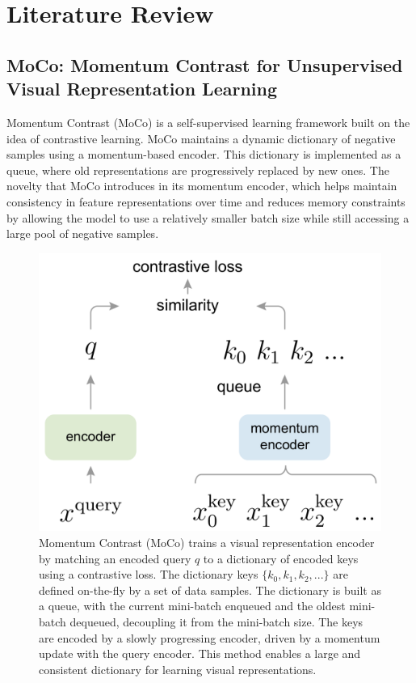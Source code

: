 \section{Literature Review}
\label{sec:related_work}

\subsection{MoCo: Momentum Contrast for Unsupervised Visual Representation Learning}

Momentum Contrast (MoCo) \cite{he2020momentum} is a self-supervised learning framework built on the idea of contrastive learning. MoCo maintains a dynamic dictionary of negative samples using a momentum-based encoder. This dictionary is implemented as a queue, where old representations are progressively replaced by new ones. The novelty that MoCo introduces in its momentum encoder, which helps maintain consistency in feature representations over time and reduces memory constraints by allowing the model to use a relatively smaller batch size while still accessing a large pool of negative samples.

\begin{figure}[t]\centering
\vspace{1.em}
\includegraphics[width=.65\linewidth]{images/MoCo_Architecture.png}
\caption{Momentum Contrast (MoCo) trains a visual representation encoder by matching an encoded query $q$ to a dictionary of encoded keys using a contrastive loss. The dictionary keys $\{k_0, k_1, k_2, ...\}$ are defined on-the-fly by a set of data samples.
The dictionary is built as a queue, with the current mini-batch enqueued and the oldest mini-batch dequeued, decoupling it from the mini-batch size.
The keys are encoded by a slowly progressing encoder, driven by a momentum update with the query encoder.
This method enables a large and consistent dictionary for learning visual representations.
\label{fig:teaser}}
\vspace{-1em}
\end{figure}

